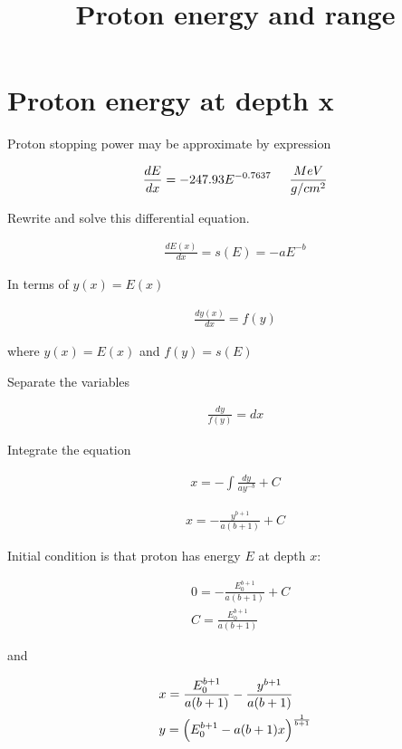 \documentclass[english]{article}
\begin{document}
\title{Proton energy and range}

\maketitle

\section{Proton energy at depth x}

Proton stopping power may be approximate by expression 

\begin{align*}
\frac{dE}{dx} = -247.93 E^{-0.7637} \hspace{0.5cm} \frac{MeV}{g/cm^2}
\end{align*}

Rewrite and solve this differential equation. 

\begin{align*}
\frac{dE(x)}{dx} = s(E) = -aE^{-b}
\end{align*}

In terms of $y(x) = E(x)$

\begin{align*}
\frac{dy(x)}{dx} = f(y)
\end{align*}

where $y(x) = E(x)$ and $f(y) = s(E)$

Separate the variables

\begin{align*}
\frac{dy}{f(y)} = dx
\end{align*}

Integrate the equation

\begin{align*}
x = -\int \frac{dy}{ay^{-b}} + C
\end{align*}

\begin{align*}
x = - \frac{y^{b+1}}{a(b+1)} + C
\end{align*}

Initial condition is that proton has energy $E$ at depth $x$:

\begin{align*}
& 0 = - \frac{E_0^{b+1}}{a(b+1)} + C \\
& C = \frac{E_0^{b+1}}{a(b+1)}
\end{align*}

and

\begin{align*}
& x = \frac{E_0^{b+1}}{a(b+1)} - \frac{y^{b+1}}{a(b+1)} \\
& y = \Bigl( E_0^{b+1} - a(b+1)x \Bigr)^\frac{1}{b+1}
\end{align*}
\end{document}
